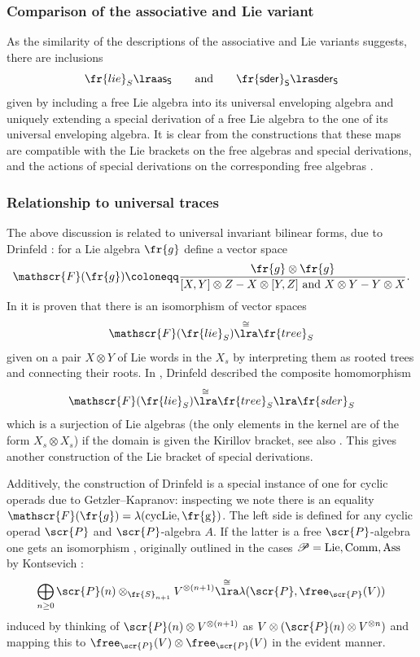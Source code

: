 \documentclass[a4paper]{amsart}
\begin{document}
\subsubsection{Comparison of the associative and Lie variant}\label{sec:trees-comp} As the similarity of the descriptions of the associative and Lie variants suggests, there are inclusions
\[\fr{lie}_S \lra \sf{as}_S \qquad \text{and} \qquad \fr{sder}_S \lra \sf{sder}_S\]
given by including a free Lie algebra into its universal enveloping algebra and uniquely extending a special derivation of a free Lie algebra to the one of its universal enveloping algebra. It is clear from the constructions that these maps are compatible with the Lie brackets on the free algebras and special derivations, and the actions of special derivations on the corresponding free algebras \cite[p.~7]{AKKN}.

\subsubsection{Relationship to universal traces} The above discussion is related to universal invariant bilinear forms, due to Drinfeld \cite[p.~856]{Drinfeld}: for a Lie algebra $\fr{g}$ define a vector space
\[\mathscr{F}(\fr{g}) \coloneqq \frac{\fr{g} \otimes \fr{g}}{[X,Y] \otimes Z - X \otimes [Y,Z] \text{ and } X\otimes Y-Y \otimes X}.\]
In \cite[Section 2.2]{AlekseevTorossianNote} it is proven that there is an isomorphism of vector spaces 
\[\mathscr{F}(\fr{lie}_S) \overset{\cong}\lra \fr{tree}_S\]
given on a pair $X \otimes Y$ of Lie words in the $X_s$ by interpreting them as rooted trees and connecting their roots. In \cite[p.~857]{Drinfeld}, Drinfeld described the composite homomorphism
\[\mathscr{F}(\fr{lie}_S) \overset{\cong}\lra \fr{tree}_S \lra \fr{sder}_S\]
which is a surjection of Lie algebras (the only elements in the kernel are of the form $X_s \otimes X_s$) if the domain is given the Kirillov bracket, see also \cite[Section 6]{KontsevichFormal}. This gives another construction of the Lie bracket of special derivations.

\begin{remark}Additively, the construction of Drinfeld is a special instance of one for cyclic operads due to Getzler--Kapranov: inspecting \cite[Definition 4.7]{GetzlerKapranov} we note there is an equality $\mathscr{F}(\fr{g}) = \lambda(\rm{cycLie},\fr{g})$. The left side is defined for any cyclic operad $\scr{P}$ and $\scr{P}$-algebra $A$. If the latter is a free $\scr{P}$-algebra one gets an isomorphism \cite[Proposition 4.9]{GetzlerKapranov}, originally outlined in the cases $\mathscr{P} = \rm{Lie},\rm{Comm},\rm{Ass}$ by Kontsevich \cite[Section 4, 5]{KontsevichFormal}:
\[\bigoplus_{n \geq 0} \scr{P}(n) \otimes_{\fr{S}_{n+1}} V^{\otimes (n+1)} \overset{\cong}\lra \lambda(\scr{P},\free_\scr{P}(V))\]
induced by thinking of $\scr{P}(n) \otimes V^{\otimes (n+1)}$ as $V \otimes (\scr{P}(n) \otimes V^{\otimes n})$ and mapping this to $\free_\scr{P}(V) \otimes \free_\scr{P}(V)$ in the evident manner.\end{remark}
\end{document}
